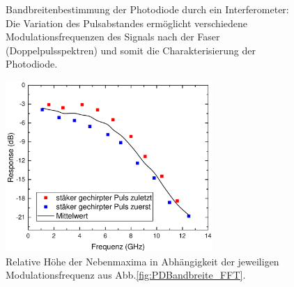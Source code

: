 \documentclass[bachelor,       %
               twoside,        %
               BCOR10mm,       %
               liststotoc,nomtotoc,bibtotoc, %
               english,ngerman, %
               final,          %
               ]{GAUBM}
\begin{document}
\begin{figure}[!htb]
   \centering
   \hfill
   \caption{Bandbreitenbestimmung der Photodiode durch ein Interferometer: Die Variation des Pulsabstandes ermöglicht verschiedene Modulationsfrequenzen des Signals nach der Faser (Doppelpulsspektren) und somit die Charakterisierung der Photodiode.}
   \label{fig:PDBandbreite}
\end{figure}

\begin{figure}[!htb]
	\centering
	\includegraphics[width=0.7\textwidth]{figures/PDBandwidth}
	\caption{Relative Höhe der Nebenmaxima in Abhängigkeit der jeweiligen Modulationsfrequenz aus Abb.\ref{fig:PDBandbreite_FFT}.}
	\label{fig:PDBandbreiteAusw}
\end{figure}
\end{document}
